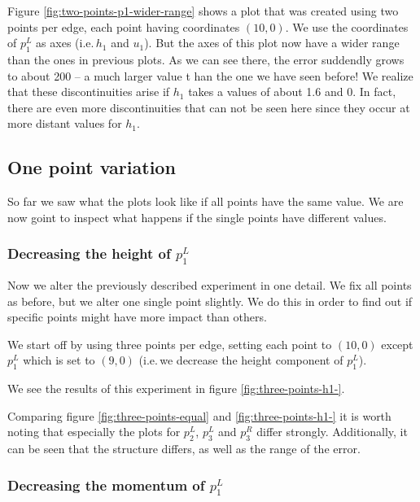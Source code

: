\documentclass{article}
\begin{document}
Figure \ref{fig:two-points-p1-wider-range} shows a plot that was created using two points per edge, each point having coordinates $(10,0)$. We use the coordinates of $p_1^L$ as axes (i.e.\,$h_1$ and $u_1$). But the axes of this plot now have a wider range than the ones in previous plots. As we can see there, the error suddendly grows to about 200 -- a much larger value t han the one we have seen before! We realize that these discontinuities arise if $h_1$ takes a values of about 1.6 and 0. In fact, there are even more discontinuities that can not be seen here since they occur at more distant values for $h_1$.

\subsection{One point variation}
\label{sec:one-point-variation}

So far we saw what the plots look like if all points have the same value. We are now goint to inspect what happens if the single points have different values.

\subsubsection{\texorpdfstring{Decreasing the height of $p_1^L$}{Decreasing the height of p1L}}
\label{sec:decreasing-height-p1}

Now we alter the previously described experiment in one detail. We fix all points as before, but we alter one single point slightly. We do this in order to find out if specific points might have more impact than others.

We start off by using three points per edge, setting each point to $\left(10, 0\right)$ except $p_1^L$ which is set to $\left(9, 0\right)$ (i.e.\,we decrease the height component of $p_1^L$).



We see the results of this experiment in figure \ref{fig:three-points-h1-}.

Comparing figure \ref{fig:three-points-equal} and \ref{fig:three-points-h1-} it is worth noting that especially the plots for $p_2^L$, $p_3^L$ and $p_3^R$ differ strongly. Additionally, it can be seen that the structure differs, as well as the range of the error.

\subsubsection{\texorpdfstring{Decreasing the momentum of $p_1^L$}{Decreasing the momentum of p1L}}
\label{sec:decreasing-momentum-p1}
\end{document}
